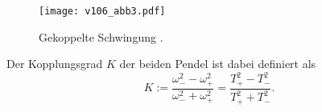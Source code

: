 \begin{figure}
    \centering
    \texttt{[image: v106\_abb3.pdf]}
    \caption{Gekoppelte Schwingung \cite{ap01}.}
    \label{fig:gekoSchwi}
\end{figure}

Der Kopplungsgrad $K$ der beiden Pendel ist dabei definiert als
\begin{equation} 
    K := \dfrac{\omega_-^2-\omega_+^2}{\omega_-^2 + \omega_+^2} = \dfrac{T_+^2 - T_-^2}{T_+^2 + T_-^2} \text{.}
\label{eq:Kopplungsgrad}
\end{equation}




